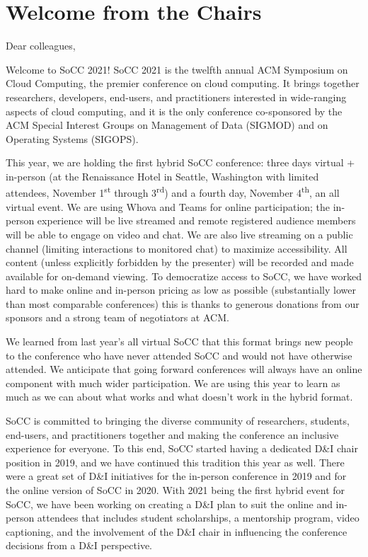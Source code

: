 \section*{Welcome from the Chairs}

\setlength{\parindent}{0em}
\setlength{\parskip}{1em}
\newcommand{\rf}[1]{\textcolor{red}{(#1 -- Rodrigo)}}

Dear colleagues,

Welcome to SoCC 2021!
SoCC 2021 is the twelfth annual ACM Symposium on Cloud Computing, the premier conference on cloud computing. It brings together researchers, developers, end-users, and practitioners interested in wide-ranging aspects of cloud computing, and it is the only conference co-sponsored by the ACM Special Interest Groups on Management of Data (SIGMOD) and on Operating Systems (SIGOPS). 

This year, we are holding the first hybrid SoCC conference:  three days virtual + in-person (at the Renaissance Hotel in Seattle, Washington with limited attendees, November 1\textsuperscript{st} through 3\textsuperscript{rd}) and a fourth day, November 4\textsuperscript{th}, an all virtual event. We are using Whova and Teams for online participation; the in-person experience will be live streamed and remote registered audience members will be able to engage on video and chat. We are also live streaming on a public channel (limiting interactions to monitored chat) to maximize accessibility. All content (unless explicitly forbidden by the presenter) will be recorded and made available for on-demand viewing. To democratize access to SoCC, we have worked hard to make online and in-person pricing as low as possible (substantially lower than most comparable conferences) this is thanks to generous donations from our sponsors and a strong team of negotiators at ACM. 

We learned from last year's all virtual SoCC that this format brings new people to the conference who have never attended SoCC and would not have otherwise attended. We anticipate that going forward conferences will always have an online component with much wider participation. We are using this year to learn as much as we can about what works and what doesn't work in the hybrid format.  

SoCC is committed to bringing the diverse community of researchers, students, end-users, and practitioners together and making the conference an inclusive experience for everyone. To this end, SoCC started having a dedicated D\&I chair position in 2019, and we have continued this tradition this year as well. There were a great set of D\&I initiatives for the in-person conference in 2019 and for the online version of SoCC in 2020. With 2021 being the first hybrid event for SoCC, we have been working on creating a D\&I plan to suit the online and in-person attendees that includes student scholarships, a mentorship program, video captioning, and the involvement of the D\&I chair in influencing the conference decisions from a D\&I perspective. 

